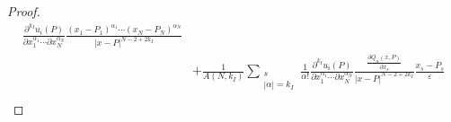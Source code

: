 \documentclass[11pt,reqno]{article}
\numberwithin{equation}{section}
\newcommand\e\varepsilon
\begin{document}
\begin{proof}
\begin{align*}
					\frac{\partial^{{ k_I}}u_i(P)}{\partial x_1^{\alpha_1}\cdots\partial x_N^{\alpha_N}}\frac{(x_1-P_1)^{\alpha_1}\cdots (x_N-P_N)^{\alpha_N}}
					{|x-P|^{N-2+2{ k_I}}}\\
                    &+\frac{1}{A(N,{ k_I})}\sum_{\substack{s\\|\alpha|={ k_I}}}\frac1{\alpha!}
					\frac{\partial^{{ k_I}}u_i(P)}{\partial x_1^{\alpha_1}\cdots\partial x_N^{\alpha_N}}\frac{\frac{\partial Q_\alpha(x,P)}{\partial x_s}}
					{|x-P|^{N-2+2{ k_I}}}\frac{x_s-P_s}{\e}\\

\end{align*}
\end{proof}
\end{document}
